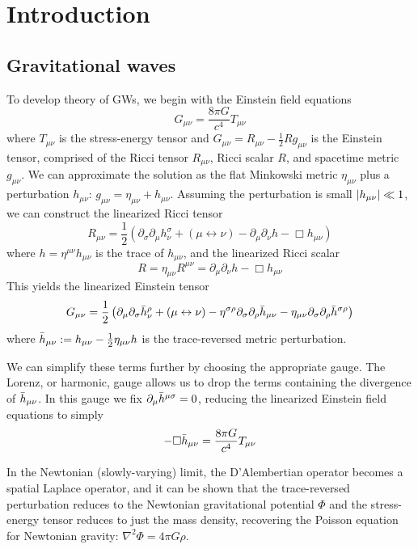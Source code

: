 \chapter{Introduction}

\section{Gravitational waves}

To develop theory of \acp{GW}, we begin with the Einstein field equations
$$G_{\mu\nu} = \frac{8\pi G}{c^4} T_{\mu\nu}$$
where $T_{\mu\nu}$ is the stress-energy tensor and $G_{\mu\nu} = R_{\mu\nu} - \frac{1}{2} R g_{\mu\nu}$ is the Einstein tensor, comprised of the Ricci tensor $R_{\mu\nu}$, Ricci scalar $R$, and spacetime metric $g_{\mu\nu}$.
We can approximate the solution as the flat Minkowski metric $\eta_{\mu\nu}$ plus a perturbation $h_{\mu\nu}$: $g_{\mu \nu} = \eta_{\mu \nu} + h_{\mu \nu}$.
Assuming the perturbation is small $\abs{h_{\mu\nu}} \ll 1$, we can construct the linearized Ricci tensor
$$R_{\mu\nu} = \frac{1}{2} (\partial_{\sigma}\partial_{\mu}h_{\nu}^{\sigma} + (\mu \leftrightarrow \nu) - \partial_{\mu}\partial_{\nu}h - \Box h_{\mu\nu})$$
where $h = \eta^{\mu\nu}h_{\mu\nu}$ is the trace of $h_{\mu\nu}$, and the linearized Ricci scalar
$$R = \eta_{\mu\nu}R^{\mu\nu} = \partial_{\mu}\partial_{\nu}h - \Box h_{\mu\nu}$$
This yields the linearized Einstein tensor
$$G_{\mu\nu} = \frac{1}{2} \left( \partial_{\mu}\partial_{\sigma}\Bar{h}_{\nu}^{\rho} + (\mu \leftrightarrow \nu) - \eta^{\sigma\rho}\partial_{\sigma}\partial_{\rho}\Bar{h}_{\mu\nu} - \eta_{\mu\nu}\partial_{\sigma}\partial_{\rho}\Bar{h}^{\sigma\rho} \right)$$
where $\Bar{h}_{\mu\nu} := h_{\mu\nu} - \frac{1}{2}\eta_{\mu\nu}h$ is the trace-reversed metric perturbation.

We can simplify these terms further by choosing the appropriate gauge.
The Lorenz, or harmonic, gauge allows us to drop the terms containing the divergence of $\Bar{h}_{\mu\nu}$.
In this gauge we fix $\partial_{\mu}\Bar{h}^{\mu\sigma} = 0$, reducing the linearized Einstein field equations to simply
\begin{equation}\label{eq:EFE}
	-\Box \Bar{h}_{\mu\nu} = \frac{8\pi G}{c^4} T_{\mu\nu}
\end{equation}

In the Newtonian (slowly-varying) limit, the D'Alembertian operator becomes a spatial Laplace operator, and it can be shown that the trace-reversed perturbation reduces to the Newtonian gravitational potential $\Phi$ and the stress-energy tensor reduces to just the mass density, recovering the Poisson equation for Newtonian gravity: $\nabla^2\Phi = 4\pi G\rho$.

